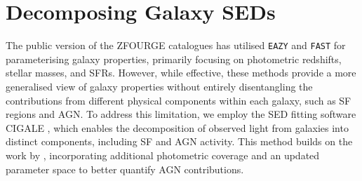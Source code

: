 \section{Decomposing Galaxy SEDs} \label{Sec: CIGALE}
The public version of the ZFOURGE catalogues has utilised \texttt{EAZY} \citep{brammer_eazy_2008} and \texttt{FAST} \citep{kriek_ultra-deep_2009} for parameterising galaxy properties, primarily focusing on photometric redshifts, stellar masses, and SFRs. However, while effective, these methods provide a more generalised view of galaxy properties without entirely disentangling the contributions from different physical components within each galaxy, such as SF regions and AGN. To address this limitation, we employ the SED fitting software CIGALE \citep{boquien_cigale_2019}, which enables the decomposition of observed light from galaxies into distinct components, including SF and AGN activity. This method builds on the work by \cite{cowley_decoupled_2018}, incorporating additional photometric coverage and an updated parameter space to better quantify AGN contributions.

